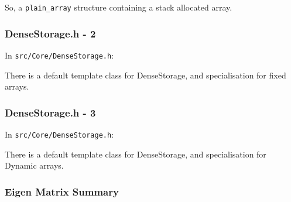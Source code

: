 So, a \texttt{plain\_array} structure containing a stack allocated
array.

\subsubsection{DenseStorage.h - 2}\label{densestorage.h---2}

In \texttt{src/Core/DenseStorage.h}:

\begin{Shaded}
\begin{Highlighting}[]
\NormalTok{<}      
\NormalTok{\{}
\end{Highlighting}
\end{Shaded}

There is a default template class for DenseStorage, and specialisation
for fixed arrays.

\subsubsection{DenseStorage.h - 3}\label{densestorage.h---3}

In \texttt{src/Core/DenseStorage.h}:

\begin{Shaded}
\begin{Highlighting}[]

\NormalTok{<}   
\NormalTok{\{}
\end{Highlighting}
\end{Shaded}

There is a default template class for DenseStorage, and specialisation
for Dynamic arrays.

\subsubsection{Eigen Matrix Summary}\label{eigen-matrix-summary}

